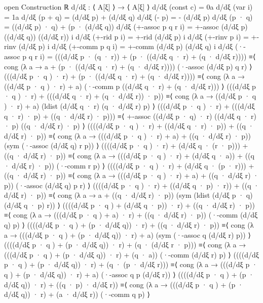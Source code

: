     open Construction ℝ
    d/dξ : ⟨ A[ξ] ⟩ → ⟨ A[ξ] ⟩
    d/dξ (const c) = 0a
    d/dξ (var i) = 1a
    d/dξ (p + q) = (d/dξ p) + (d/dξ q)
    d/dξ (- p) = - (d/dξ p)
    d/dξ (p · q) = ((d/dξ p) · q) + (p · (d/dξ q))
    d/dξ (+-assoc p q r i) = +-assoc (d/dξ p) ((d/dξ q)) ((d/dξ r)) i
    d/dξ (+-rid p i) = +-rid (d/dξ p) i
    d/dξ (+-rinv p i) = +-rinv (d/dξ p) i
    d/dξ (+-comm p q i) = +-comm (d/dξ p) (d/dξ q) i
    d/dξ (·-assoc p q r i) = (((d/dξ p · (q · r)) + (p · ((d/dξ q · r) + (q · d/dξ r)))) ≡⟨ cong (λ a → a + (p · ((d/dξ q · r) + (q · d/dξ r)))) (·-assoc (d/dξ p) q r) ⟩ 
                              (((d/dξ p · q ) · r) + (p · ((d/dξ q · r) + (q · d/dξ r)))) ≡⟨ cong (λ a → ((d/dξ p · q ) · r) + a) (·-comm p ((d/dξ q · r) + (q · d/dξ r))) ⟩ 
                              (((d/dξ p · q ) · r) + (((d/dξ q · r) + (q · d/dξ r)) · p)) ≡⟨ cong (λ a → ((d/dξ p · q ) · r) + a) (ldist (d/dξ q · r) (q · d/dξ r) p) ⟩ 
                              (((d/dξ p · q ) · r) + (((d/dξ q · r) · p) + ((q · d/dξ r) · p))) ≡⟨ +-assoc ((d/dξ p · q) · r) ((d/dξ q · r) · p) ((q · d/dξ r) · p) ⟩ 
                              ((((d/dξ p · q ) · r) + ((d/dξ q · r) · p)) + ((q · d/dξ r) · p)) ≡⟨ cong (λ a → (((d/dξ p · q ) · r) + a) + ((q · d/dξ r) · p)) (sym (·-assoc (d/dξ q) r p)) ⟩ 
                              ((((d/dξ p · q ) · r) + (d/dξ q · (r · p))) + ((q · d/dξ r) · p)) ≡⟨ cong (λ a → (((d/dξ p · q ) · r) + (d/dξ q · a)) + ((q · d/dξ r) · p)) (·-comm r p) ⟩ 
                              ((((d/dξ p · q ) · r) + (d/dξ q · (p · r))) + ((q · d/dξ r) · p)) ≡⟨ cong (λ a → (((d/dξ p · q ) · r) + a) + ((q · d/dξ r) · p)) (·-assoc (d/dξ q) p r) ⟩
                              ((((d/dξ p · q ) · r) + ((d/dξ q · p) · r)) + ((q · d/dξ r) · p)) ≡⟨ cong (λ a → a + ((q · d/dξ r) · p)) (sym (ldist (d/dξ p · q) (d/dξ q · p) r)) ⟩ 
                              ((((d/dξ p · q ) + (d/dξ q · p)) · r) + ((q · d/dξ r) · p)) ≡⟨ cong (λ a → (((d/dξ p · q ) + a) · r) + ((q · d/dξ r) · p)) (·-comm (d/dξ q) p) ⟩ 
                              ((((d/dξ p · q ) + (p · d/dξ q)) · r) + ((q · d/dξ r) · p)) ≡⟨ cong (λ a → (((d/dξ p · q ) + (p · d/dξ q)) · r) + a) (sym (·-assoc q (d/dξ r) p)) ⟩
                              ((((d/dξ p · q ) + (p · d/dξ q)) · r) + (q · (d/dξ r · p))) ≡⟨ cong (λ a → (((d/dξ p · q ) + (p · d/dξ q)) · r) + (q · a)) (·-comm (d/dξ r) p) ⟩
                              ((((d/dξ p · q ) + (p · d/dξ q)) · r) + (q · (p · d/dξ r))) ≡⟨ cong (λ a → (((d/dξ p · q ) + (p · d/dξ q)) · r) + a) (·-assoc q p (d/dξ r)) ⟩
                              ((((d/dξ p · q ) + (p · d/dξ q)) · r) + ((q · p) · d/dξ r)) ≡⟨ cong (λ a → (((d/dξ p · q ) + (p · d/dξ q)) · r) + (a · d/dξ r)) (·-comm q p) ⟩
